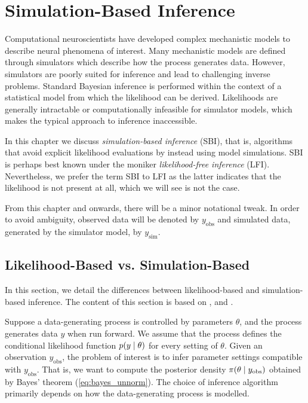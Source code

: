 
\chapter{Simulation-Based Inference}\label{chap:sbi}

Computational neuroscientists have developed complex mechanistic models to describe neural phenomena of interest. Many mechanistic models are defined through simulators which describe how the process generates data. However, simulators are poorly suited for inference and lead to challenging inverse problems. Standard Bayesian inference is performed within the context of a statistical model from which the likelihood can be derived. Likelihoods are generally intractable or computationally infeasible for simulator models, which makes the typical approach to inference inaccessible. 

In this chapter we discuss \textit{simulation-based inference} (SBI), that is, algorithms that avoid explicit likelihood evaluations by instead using model simulations. SBI is perhaps best known under the moniker \textit{likelihood-free inference} (LFI). Nevertheless, we prefer the term SBI to LFI as the latter indicates that the likelihood is not present at all, which we will see is not the case.

From this chapter and onwards, there will be a minor notational tweak. In order to avoid ambiguity, observed data will be denoted by $y_\mathrm{obs}$ and simulated data, generated by the simulator model, by $y_\mathrm{sim}$.


\section{Likelihood-Based vs. Simulation-Based}

In this section, we detail the differences between likelihood-based and simulation-based inference. The content of this section is based on \cite{abc_handbook}, \cite{sbi_review} and \cite{snl_thesis}.


Suppose a data-generating process is controlled by parameters $\theta$, and the process generates data $y$ when run forward. We assume that the process defines the conditional likelihood function $p \qty(y \mid \theta)$ for every setting of $\theta$. Given an observation $y_\mathrm{obs}$, the problem of interest is to infer parameter settings compatible with $y_\mathrm{obs}$. That is, we want to compute the posterior density $\pi \qty(\theta \mid y_\mathrm{obs})$  obtained by Bayes' theorem (\autoref{eq:bayes_unnorm}). The choice of inference algorithm primarily depends on how the data-generating process is modelled. 

